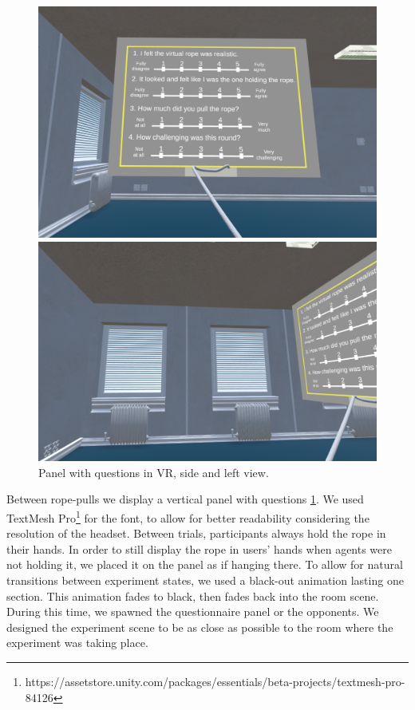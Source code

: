 \begin{figure}
  \centering
  \captionsetup{justification=centering,margin=0.1cm}
\hspace*{\fill}
  \begin{minipage}[b]{0.4\textwidth}
    \includegraphics[width=\textwidth]{Images/quizzPanel.png}
    \end{minipage}
  \hfill
  \begin{minipage}[b]{0.4\textwidth}
    \includegraphics[width=\textwidth]{Images/quizzPanelSide.png}
      \end{minipage}
\hspace*{\fill}
  \caption{Panel with questions in VR, side and left view.}
     \label{fig:VRPanel}
\end{figure}
Between rope-pulls we display a vertical panel with questions \ref{fig:VRPanel}. We used TextMesh Pro\footnote{https://assetstore.unity.com/packages/essentials/beta-projects/textmesh-pro-84126} for the font, to allow for better readability considering the resolution of the headset. Between trials, participants always hold the rope in their hands. In order to still display the rope in users' hands when agents were not holding it, we placed it on the panel as if hanging there. To allow for natural transitions between experiment states, we used a black-out animation lasting one section. This animation fades to black, then fades back into the room scene. During this time, we spawned the questionnaire panel or the opponents. We designed the experiment scene to be as close as possible to the room where the experiment was taking place.
